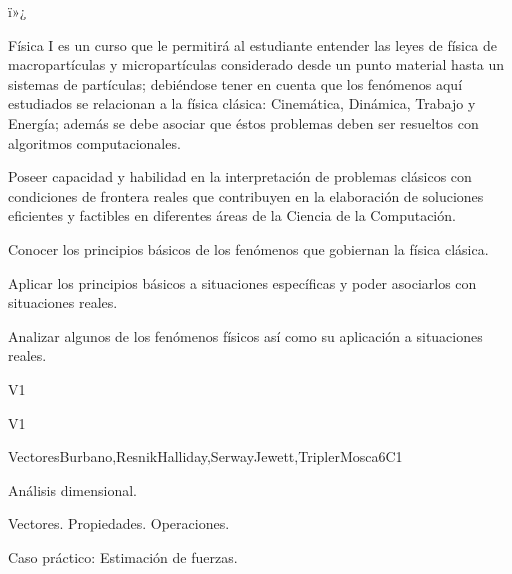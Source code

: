 ï»¿\begin{syllabus}

   
   \begin{justification}
   Física I es un curso que le permitirá al estudiante entender
   las leyes de física de macropartículas y micropartículas considerado desde un
   punto material hasta un sistemas de partículas; debiéndose tener en cuenta que los
   fenómenos aquí estudiados se relacionan a la física clásica: Cinemática, Dinámica, Trabajo y Energía; 
   además se debe asociar que éstos problemas deben ser resueltos con algoritmos computacionales.
   
   Poseer capacidad y habilidad en la interpretación de problemas clásicos
   con condiciones de frontera reales que contribuyen en la elaboración de soluciones eficientes
   y factibles en diferentes áreas de la Ciencia de la Computación.
   \end{justification}
   
   \begin{goals}
   \item Conocer los principios básicos de los fenómenos que gobiernan la física clásica.
   \item Aplicar los principios básicos a situaciones específicas y poder asociarlos con situaciones reales.
   \item Analizar algunos de los fenómenos físicos así como su aplicación a situaciones reales.
   \end{goals}
   
   \begin{outcomes}{V1}
     \item {}
     \item {}
     \item {}
   \end{outcomes}
   
   \begin{competences}{V1}
     \item {} 
     \item {}
     \item {}
   \end{competences}
   
   \begin{unit}{Vectores}{}{Burbano,ResnikHalliday,SerwayJewett,TriplerMosca}{6}{C1}
   \begin{topics}
         \item Análisis dimensional.
         \item Vectores. Propiedades. Operaciones.
         \item Caso práctico: Estimación de fuerzas.
      \end{topics}
   

\end{unit}
\end{syllabus}

